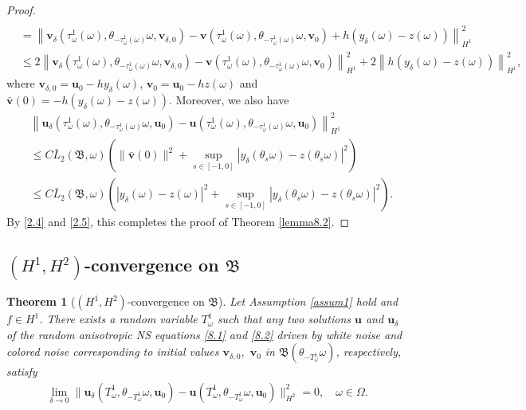 \documentclass{elsarticle}
\newtheorem{theorem}{Theorem}[section]
\theoremstyle{definition}
\numberwithin{equation}{section}
\begin{document}
\begin{proof}
\begin{align*}
 \nonumber\\
& =\left \| \textbf{v}_\delta \! \left ( \tau_\omega^1 (\omega) ,\theta_{-\tau_\omega^1(\omega)}\omega,  \textbf{v}_{\delta,0}\right)
 - \textbf{v} \! \left ( \tau_\omega^1 (\omega) ,\theta_{-\tau_\omega^1(\omega)}\omega, \textbf{v}_{0}\right)+h(y_\delta(\omega)-z(\omega)) \right \|^2_{H^1}\nonumber\\
&\leq 2\left \| \textbf{v}_\delta \! \left ( \tau_\omega^1 (\omega) ,\theta_{-\tau_\omega^1(\omega)}\omega,  \textbf{v}_{\delta,0}\right)
 - \textbf{v} \! \left ( \tau_\omega^1 (\omega) ,\theta_{-\tau_\omega^1(\omega)}\omega, \textbf{v}_{0}\right)\right\|^2_{H^1}+2\left\|h\left (y_\delta(\omega)-z(\omega)\right ) \right \|^2_{H^1},
\end{align*}
where $\textbf{v}_{\delta,0}=\textbf{u}_0-hy_\delta(\omega)$, $\textbf{v}_{0}=\textbf{u}_0-hz(\omega)$  and $\bar{\textbf{v}}(0)=-h(y_\delta(\omega)-z(\omega))$. Moreover, we also have
\begin{align*}
&\left \| \textbf{u}_\delta \! \left ( \tau_\omega^1 (\omega) ,\theta_{-\tau_\omega^1(\omega)}\omega,  \textbf{u}_{0}\right)
 - \textbf{u} \! \left ( \tau_\omega^1 (\omega) ,\theta_{-\tau_\omega^1(\omega)}\omega, \textbf{u}_{0}\right) \right \|^2_{H^1}\nonumber\\
 &\leq C\bar{L}_2({\mathfrak B}, \omega)\left (\|\bar{\textbf{v}}(0)\|^2+\sup\limits_{s\in[-1,0]}|y_\delta(\theta_s\omega)-z(\theta_s\omega)|^2\right )\nonumber\\
 &\leq C\bar{L}_2({\mathfrak B}, \omega)\left (|y_\delta(\omega)-z(\omega)|^2+\sup\limits_{s\in[-1,0]}|y_\delta(\theta_s\omega)-z(\theta_s\omega)|^2\right ).
\end{align*}
By \eqref{2.4} and \eqref{2.5}, this completes the proof of Theorem \ref{lemma8.2}.

\end{proof}

\subsection{$(H^1, H^2)$-convergence on $\mathfrak B$}
\begin{theorem}[$(H^1, H^2)$-convergence on $\mathfrak B$]\label{lemma8.3}  Let Assumption \ref{assum1} hold and $f\in H^1$. There  exists a  random variable $T_\omega^1$  such that   any
 two solutions $\textbf{u}$ and $\textbf{u}_\delta$ of the random anisotropic  NS equations \eqref{8.1} and \eqref{8.2} driven by  white noise  and colored noise corresponding to initial values  $\textbf{v}_{\delta,0},$ $\textbf{v}_{0}$ in $\mathfrak{B}(\theta_{-T_\omega^1}\omega)$, respectively,   satisfy
\begin{align*}
 \lim\limits_{\delta\rightarrow0}\|\textbf{u}_\delta(T_\omega^1,\theta_{-T_\omega^1}\omega,\textbf{u}_{0})
 -\textbf{u}(T_\omega^1,\theta_{-T_\omega^1}\omega,\textbf{u}_{0}) \big \|^2_{H^2}=0, \quad \omega\in \Omega.
\end{align*}
\end{theorem}
\end{document}
